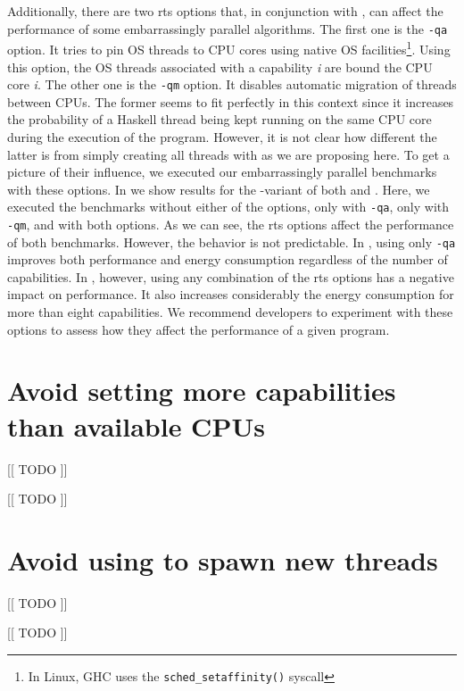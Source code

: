 Additionally, there are two \ac{rts} options that, in conjunction with \forkOn, can affect the performance of some embarrassingly parallel algorithms. The first one is the \texttt{-qa} option. It tries to pin OS threads to CPU cores using native OS facilities\footnote{In Linux, GHC uses the \texttt{sched\_setaffinity()} syscall}. Using this option, the OS threads associated with a capability \emph{i} are bound the CPU core \emph{i}. The other one is the \texttt{-qm} option. It disables automatic migration of threads between CPUs. The former seems to fit perfectly in this context since it increases the probability of a Haskell thread being kept running on the same CPU core during the execution of the program. However, it is not clear how different the latter is from simply creating all threads with \forkOn as we are proposing here. To get a picture of their influence, we executed our embarrassingly parallel benchmarks with these options. In  we show results for the \forkOn-\MVar variant of both \regex and \spectral. Here, we executed the benchmarks without either of the options, only with \texttt{-qa}, only with \texttt{-qm}, and with both options. As we can see, the \ac{rts} options affect the performance of both benchmarks. However, the behavior is not predictable. In \spectral, using only \texttt{-qa} improves both performance and energy consumption regardless of the number of capabilities. In \regex, however, using any combination of the \ac{rts} options has a negative impact on performance. It also increases considerably the energy consumption for more than eight capabilities. We recommend developers to experiment with these options to assess how they affect the performance of a given program.


\section{Avoid setting more capabilities than available CPUs}
 [[ TODO ]]
\newline

 [[ TODO ]]


\section{Avoid using \forkOS to spawn new threads}
 [[ TODO ]]
\newline

 [[ TODO ]]

